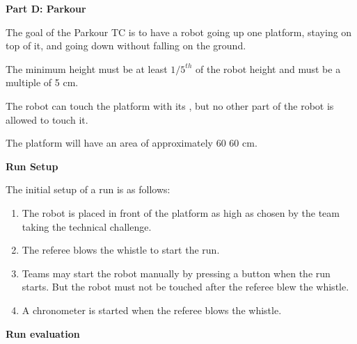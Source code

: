 \clearpage
\sffamily
{\bfseries\color[rgb]{0.4,0.4,0.4} Part D: Parkour}
{}


\bigskip
The goal of the Parkour TC is to have a robot going up one platform, staying on top of it, and going down without falling on the ground.

The minimum height must be at least $1/5^{th}$ of the robot height and must be a multiple of 5 cm.

The robot can touch the platform with its , but no other part of the robot is allowed to touch it.

The platform will have an area of approximately 60 {\texttimes} 60 cm.

\bigskip

{\bfseries Run Setup}

\smallskip

The initial setup of a run is as follows:

\begin{enumerate}

\item The robot is placed in front of the platform as high as chosen by the team taking the technical challenge.

\item The referee blows the whistle to start the run.

\item Teams may start the robot manually by pressing a button when the run starts. But the robot must not be touched after the referee blew the whistle. 

\item A chronometer is started when the referee blows the whistle.
\end{enumerate}

{\bfseries Run evaluation}

\smallskip

